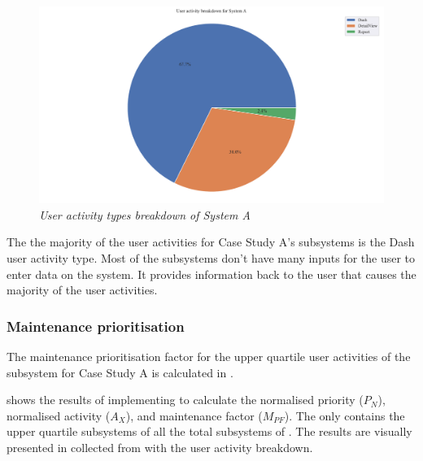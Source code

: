 \begin{figure}[!htb]
	\centering %
	\includegraphics[width=0.95\linewidth]{img/ch3/analysis/case_A_breakdown.pdf}
	\caption[User activity types breakdown of System A]
	{\textit{User activity types breakdown of System A}}\label{fig:ch3_caseABreakdown}
\end{figure} 

The  the majority of the user activities for Case Study A's subsystems is the Dash user activity type. Most of the subsystems don't have many inputs for the user to enter data on the system. It provides information back to the user that causes the majority of the user activities. 

\subsubsection{Maintenance prioritisation}
The maintenance prioritisation factor for the upper quartile user activities of the subsystem for Case Study A is calculated in .



 shows the results of implementing  to calculate the normalised priority ($P_N$), normalised activity ($A_X$), and maintenance factor ($M_{PF}$). The  only contains the upper quartile subsystems of all the total subsystems of . The results are visually presented in  collected from  with the user activity breakdown.

\clearpage

